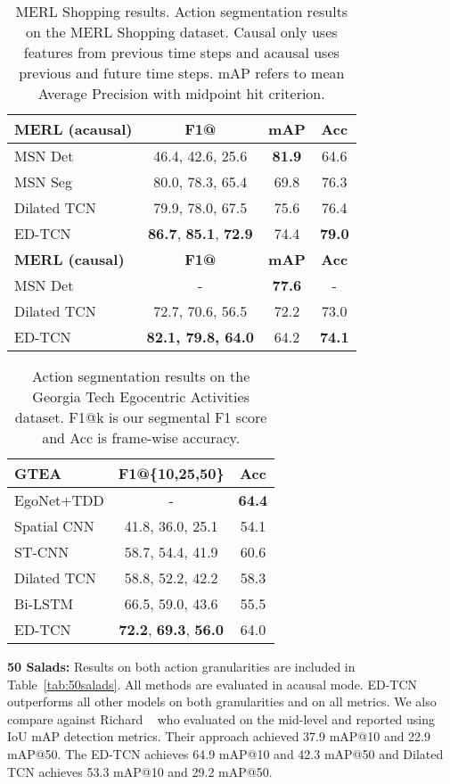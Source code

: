 \documentclass[10pt,twocolumn,letterpaper]{article}
\newcommand{\fakesubsection}[1]{\smallskip\noindent\textbf{#1:}}
\begin{document}
\begin{table}
\centering 
\begin{tabular}{| l | c  | c | c |}
\hline
\textbf{MERL (acausal)} &  \textbf{F1@} & \textbf{mAP} & \textbf{Acc} \\
\hline
MSN Det \cite{singh_cvpr_2016_merl}  & 46.4,  42.6, 25.6  & \textbf{81.9} & 64.6 \\
MSN Seg \cite{singh_cvpr_2016_merl} &  80.0, 78.3, 65.4 & 69.8& 76.3 \\
Dilated TCN & 79.9, 78.0, 67.5& 75.6 & 76.4  \\
ED-TCN &  \textbf{86.7}, \textbf{85.1}, \textbf{72.9}& 74.4 & \textbf{79.0}    \\      
\hline
\textbf{MERL (causal)} &  \textbf{F1@} & \textbf{mAP} & \textbf{Acc} \\
\hline
MSN Det  \cite{singh_cvpr_2016_merl} & - & \textbf{77.6} & -  \\ 
Dilated TCN  & 72.7, 70.6, 56.5 & 72.2 & 73.0  \\
ED-TCN  & \textbf{82.1, 79.8, 64.0}  & 64.2 & \textbf{74.1}\\
\hline
\end{tabular}
\label{tab:MERL}
\caption{MERL Shopping results. 
Action segmentation results on the MERL Shopping dataset. Causal only uses features from previous time steps and acausal uses previous and future time steps. mAP refers to mean Average Precision with midpoint hit criterion.
}
\end{table}

\begin{table}
\centering
\begin{tabular}{| l | c | c  |}
\hline
\textbf{GTEA} & \textbf{F1@\{10,25,50\}}   & \textbf{Acc} \\
\hline
EgoNet+TDD \cite{singh_cvpr_2016_ego}& - &  \textbf{64.4} \\
Spatial CNN~\cite{lea_eccv_2016}  & 41.8, 36.0, 25.1  &   54.1 \\
ST-CNN~\cite{lea_eccv_2016}  & 58.7, 54.4, 41.9 &  60.6 \\ 
Dilated TCN  & 58.8, 52.2, 42.2 &  58.3 \\ 
Bi-LSTM  & 66.5, 59.0, 43.6 &  55.5 \\ 
ED-TCN & \textbf{72.2}, \textbf{69.3}, \textbf{56.0} & 64.0  \\
\hline
\end{tabular}      
\label{tab:gtea}
\caption{Action segmentation results on the Georgia Tech Egocentric Activities dataset. F1@k is our segmental F1 score and Acc is frame-wise accuracy. 
}
\end{table}
\fakesubsection{50 Salads}
Results on both action granularities are included in Table~\ref{tab:50salads}. All methods are evaluated in acausal mode. 
ED-TCN outperforms all other models on both granularities and on all metrics. 
We also compare against Richard \etal~\cite{richard_cvpr_2016} who evaluated on the mid-level and reported using IoU mAP detection metrics. Their approach achieved 37.9 mAP@10 and 22.9 mAP@50. The ED-TCN achieves 64.9 mAP@10 and 42.3 mAP@50 and Dilated TCN achieves 53.3 mAP@10 and 29.2 mAP@50. 
\end{document}
